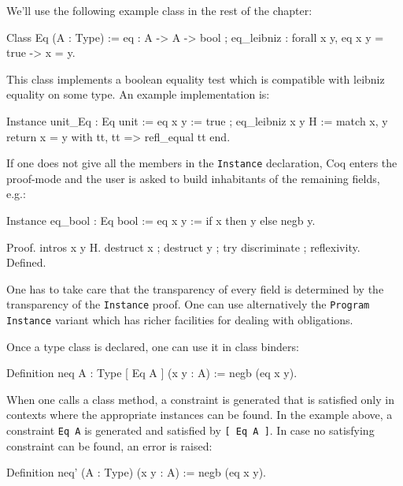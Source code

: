We'll use the following example class in the rest of the chapter:

\begin{coq_example*}
Class Eq (A : Type) :=
  eq : A -> A -> bool ;
  eq_leibniz : forall x y, eq x y = true -> x = y.
\end{coq_example*}

This class implements a boolean equality test which is compatible with
leibniz equality on some type. An example implementation is:

\begin{coq_example*}
Instance unit_Eq : Eq unit :=
  eq x y := true ;
  eq_leibniz x y H := 
    match x, y return x = y with tt, tt => refl_equal tt end.
\end{coq_example*}

If one does not give all the members in the \texttt{Instance}
declaration, Coq enters the proof-mode and the user is asked to build
inhabitants of the remaining fields, e.g.:

\begin{coq_example*}
Instance eq_bool : Eq bool :=
  eq x y := if x then y else negb y.
\end{coq_example*}

\begin{coq_example}
  Proof. intros x y H.
  destruct x ; destruct y ; try discriminate ; reflexivity. 
  Defined.
\end{coq_example}

One has to take care that the transparency of every field is determined
by the transparency of the \texttt{Instance} proof. One can use
alternatively the \texttt{Program} \texttt{Instance}  variant which has
richer facilities for dealing with obligations.


Once a type class is declared, one can use it in class binders:
\begin{coq_example}
  Definition neq {A : Type} [ Eq A ] (x y : A) := negb (eq x y).
\end{coq_example}

When one calls a class method, a constraint is generated that is
satisfied only in contexts where the appropriate instances can be
found. In the example above, a constraint \texttt{Eq A} is generated and
satisfied by \texttt{[ Eq A ]}. In case no satisfying constraint can be
found, an error is raised:

\begin{coq_example}
  Definition neq' (A : Type) (x y : A) := negb (eq x y).
\end{coq_example}

